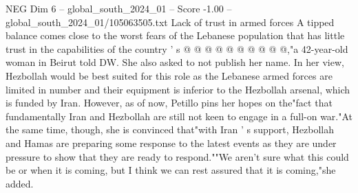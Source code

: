 \begin{textsample}{NEG Dim 6 – global\_south\_2024\_01 – Score -1.00 – global\_south\_2024\_01/105063505.txt}
Lack of trust in armed forces A tipped balance comes close to the worst fears of the Lebanese population that has little trust in the capabilities of the country ' s @ @ @ @ @ @ @ @ @ @,"a 42-year-old woman in Beirut told DW.
She also asked to not publish her name.
In her view, Hezbollah would be best suited for this role as the Lebanese armed forces are limited in number and their equipment is inferior to the Hezbollah arsenal, which is funded by Iran.
However, as of now, Petillo pins her hopes on the"fact that fundamentally Iran and Hezbollah are still not keen to engage in a full-on war."At the same time, though, she is convinced that"with Iran ' s support, Hezbollah and Hamas are preparing some response to the latest events as they are under pressure to show that they are ready to respond.""We aren't sure what this could be or when it is coming, but I think we can rest assured that it is coming,"she added.

\end{textsample}
